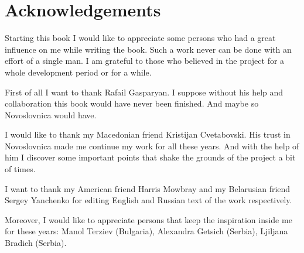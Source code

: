 \chapter{Acknowledgements}

Starting this book I would like to appreciate some persons who had a great influence on me while writing the book. Such a work never can be done with an effort of a single man. I am grateful to those who believed in the project for a whole development period or for a while.

First of all I want to thank Rafail Gasparyan. I suppose without his help and collaboration this book would have never been finished. And maybe so Novoslovnica would have.

I would like to thank my Macedonian friend Kristijan Cvetabovski. His trust in Novoslovnica made me continue my work for all these years. And with the help of him I discover some important points that shake the grounds of the project a bit of times.

I want to thank my American friend Harris Mowbray and my Belarusian friend Sergey Yanchenko for editing English and Russian text of the work respectively.

Moreover, I would like to appreciate persons that keep the inspiration inside me for these years: Manol Terziev (Bulgaria), Alexandra Getsich (Serbia), Ljiljana Bradich (Serbia).




